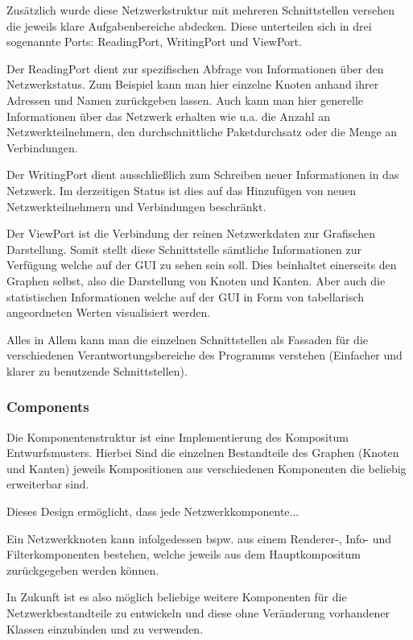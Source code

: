 Zusätzlich wurde diese Netzwerkstruktur mit mehreren Schnittstellen versehen die jeweils klare Aufgabenbereiche abdecken. Diese unterteilen sich in drei sogenannte Ports: ReadingPort, WritingPort und ViewPort.

Der ReadingPort dient zur spezifischen Abfrage von Informationen über den Netzwerkstatus. Zum Beispiel kann man hier einzelne Knoten anhand ihrer Adressen und Namen zurückgeben lassen. Auch kann man hier generelle Informationen über das Netzwerk erhalten wie u.a. die Anzahl an Netzwerkteilnehmern, den durchschnittliche Paketdurchsatz oder die Menge an Verbindungen.

Der WritingPort dient ausschließlich zum Schreiben neuer Informationen in das Netzwerk. Im derzeitigen Status ist dies auf das Hinzufügen von neuen Netzwerkteilnehmern und Verbindungen beschränkt.

Der ViewPort ist die Verbindung der reinen Netzwerkdaten zur Grafischen Darstellung. Somit stellt diese Schnittstelle sämtliche Informationen zur Verfügung welche auf der GUI zu sehen sein soll.
Dies beinhaltet einerseits den Graphen selbst, also die Darstellung von Knoten und Kanten. Aber auch die statistischen Informationen welche auf der GUI in Form von tabellarisch angeordneten Werten visualisiert werden.

Alles in Allem kann man die einzelnen Schnittstellen als Fassaden für die verschiedenen Verantwortungsbereiche des Programms verstehen (Einfacher und klarer zu benutzende Schnittstellen).

\subsubsection{Components}

Die Komponentenstruktur ist eine Implementierung des Kompositum Entwurfsmusters. Hierbei Sind die einzelnen Bestandteile des Graphen (Knoten und Kanten) jeweils Kompositionen aus verschiedenen Komponenten die beliebig erweiterbar sind.

Dieses Design ermöglicht, dass jede Netzwerkkomponente...

Ein Netzwerkknoten kann infolgedessen bspw. aus einem Renderer-, Info- und Filterkomponenten bestehen, welche jeweils aus dem Hauptkompositum zurückgegeben werden können.

In Zukunft ist es also möglich beliebige weitere Komponenten für die Netzwerkbestandteile zu entwickeln und diese ohne Veränderung vorhandener Klassen einzubinden und zu verwenden.


